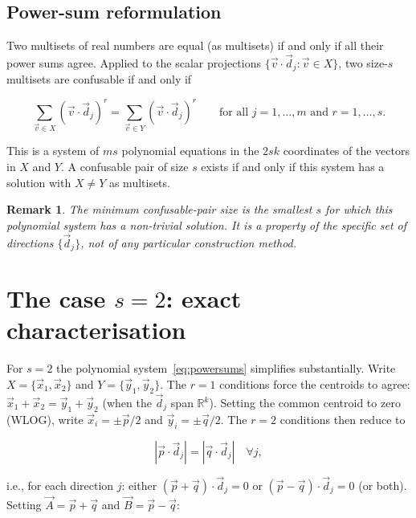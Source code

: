 \documentclass[12pt,a4paper]{article}
\newtheorem{remark}{Remark}
\begin{document}
\subsection*{Power-sum reformulation}

Two multisets of real numbers are equal (as multisets) if and only if
all their power sums agree.  Applied to the scalar projections
$\{\vec{v} \cdot \vec{d}_j : \vec{v} \in X\}$, two size-$s$ multisets
are confusable if and only if

\begin{equation}
  \label{eq:powersums}
  \sum_{\vec{v} \in X} (\vec{v} \cdot \vec{d}_j)^r
  =
  \sum_{\vec{v} \in Y} (\vec{v} \cdot \vec{d}_j)^r
  \qquad \text{for all } j = 1, \ldots, m \text{ and } r = 1, \ldots, s.
\end{equation}

This is a system of $ms$ polynomial equations in the $2sk$ coordinates
of the vectors in $X$ and $Y$.  A confusable pair of size $s$ exists if
and only if this system has a solution with $X \neq Y$ as multisets.

\begin{remark}
  The minimum confusable-pair size is the smallest $s$ for which this
  polynomial system has a non-trivial solution.  It is a property of the
  specific set of directions $\{\vec{d}_j\}$, not of any particular
  construction method.
\end{remark}

\section{The case \texorpdfstring{$s = 2$}{s = 2}: exact characterisation}
\label{sec:s2}

For $s = 2$ the polynomial system~\eqref{eq:powersums} simplifies
substantially.  Write $X = \{\vec{x}_1, \vec{x}_2\}$ and
$Y = \{\vec{y}_1, \vec{y}_2\}$.  The $r = 1$ conditions force the
centroids to agree: $\vec{x}_1 + \vec{x}_2 = \vec{y}_1 + \vec{y}_2$
(when the $\vec{d}_j$ span $\mathbb{R}^k$).  Setting the common centroid
to zero (WLOG), write $\vec{x}_i = \pm\vec{p}/2$ and
$\vec{y}_i = \pm\vec{q}/2$.  The $r = 2$ conditions then reduce to

\[
  |\vec{p} \cdot \vec{d}_j| = |\vec{q} \cdot \vec{d}_j|
  \quad \forall j,
\]

i.e., for each direction $j$: either $(\vec{p} + \vec{q}) \cdot \vec{d}_j
= 0$ or $(\vec{p} - \vec{q}) \cdot \vec{d}_j = 0$ (or both).  Setting
$\vec{A} = \vec{p} + \vec{q}$ and $\vec{B} = \vec{p} - \vec{q}$:
\end{document}
